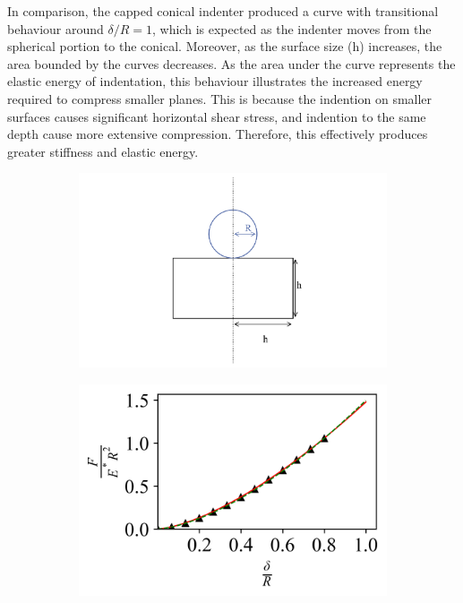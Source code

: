 In comparison, the capped conical indenter produced a curve with transitional behaviour around $\delta/R=1$, which is expected as the indenter moves from the spherical portion to the conical. Moreover, as the surface size (h) increases, the area bounded by the curves decreases. As the area under the curve represents the elastic energy of indentation, this behaviour illustrates the increased energy required to compress smaller planes. This is because the indention on smaller surfaces causes significant horizontal shear stress, and indention to the same depth cause more extensive compression. Therefore, this effectively produces greater stiffness and elastic energy. 

\begin{figure}[H]
\centering

    \begin{subfigure}[t]{0.32\textwidth}
        \centering
        \caption{\label{fig: Sphere-Plane-Setup}}
        \includegraphics[width=1\linewidth]{Figures/Sphere-Plane-Setup.png}
    \end{subfigure}  
    \hfill
    \begin{subfigure}[t]{0.32\textwidth}
        \centering
        \caption{\label{fig: Sphere-Plane-Contact_Models}  }
        \includegraphics[width=1\linewidth]{Figures/Sphere-Plane-Contact_Models.png}

\end{subfigure}
\end{figure}
